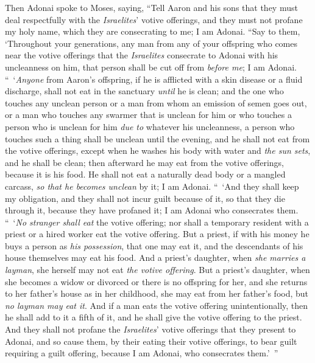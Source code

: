 \begin{biblechapter} %
 Then Adonai spoke to Moses, saying,
\verse “Tell Aaron and his sons that they must deal respectfully with the \textit{Israelites}’ votive offerings, and they must not profane my holy name, which they are consecrating to me; I am Adonai.
\verse “Say to them, ‘Throughout your generations, any man from any of your offspring who comes near the votive offerings that the \textit{Israelites} consecrate to Adonai with his uncleanness on him, that person shall be cut off from \textit{before me}; I am Adonai.
\verse “ ‘\textit{Anyone} from Aaron’s offspring, if he is afflicted with a skin disease or a fluid discharge, shall not eat in the sanctuary \textit{until} he is clean; and the one who touches any unclean person or a man from whom an emission of semen goes out,
\verse or a man who touches any swarmer that is unclean for him or who touches a person who is unclean for him \textit{due to} whatever his uncleanness,
\verse a person who touches such a thing shall be unclean until the evening, and he shall not eat from the votive offerings, except when he washes his body with water
\verse and \textit{the sun sets}, and he shall be clean; then afterward he may eat from the votive offerings, because it is his food.
\verse He shall not eat a naturally dead body or a mangled carcass, \textit{so that he becomes unclean} by it; I am Adonai.
\verse “ ‘And they shall keep my obligation, and they shall not incur guilt because of it, so that they die through it, because they have profaned it; I am Adonai who consecrates them.
\verse “ ‘\textit{No stranger shall eat} the votive offering; nor shall a temporary resident with a priest or a hired worker eat the votive offering.
\verse But a priest, if with his money he buys a person as \textit{his possession}, that one may eat it, and the descendants of his house themselves may eat his food.
\verse And a priest’s daughter, when \textit{she marries a layman}, she herself may not eat \textit{the votive offering}.
\verse But a priest’s daughter, when she becomes a widow or divorced or there is no offspring for her, and she returns to her father’s house as in her childhood, she may eat from her father’s food, but \textit{no layman may eat it}.
\verse And if a man eats the votive offering unintentionally, then he shall add to it a fifth of it, and he shall give the votive offering to the priest.
\verse And they shall not profane the \textit{Israelites}’ votive offerings that they present to Adonai,
\verse and so cause them, by their eating their votive offerings, to bear guilt requiring a guilt offering, because I am Adonai, who consecrates them.’ ”

\end{biblechapter}
